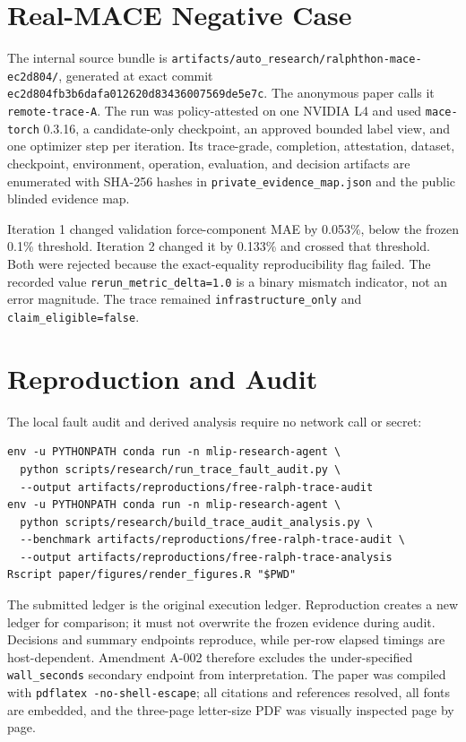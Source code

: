 \documentclass[10pt]{article}
\begin{document}
\section{Real-MACE Negative Case}

The internal source bundle is
\texttt{artifacts/auto\_research/ralphthon-mace-ec2d804/}, generated at exact commit
\texttt{ec2d804fb3b6dafa012620d83436007569de5e7c}. The anonymous paper calls it \texttt{remote-trace-A}. The run was policy-attested on one NVIDIA L4 and used \texttt{mace-torch} 0.3.16, a candidate-only checkpoint, an approved bounded label view, and one optimizer step per iteration. Its trace-grade, completion, attestation, dataset, checkpoint, environment, operation, evaluation, and decision artifacts are enumerated with SHA-256 hashes in \texttt{private\_evidence\_map.json} and the public blinded evidence map.

Iteration 1 changed validation force-component MAE by 0.053\%, below the frozen 0.1\% threshold. Iteration 2 changed it by 0.133\% and crossed that threshold. Both were rejected because the exact-equality reproducibility flag failed. The recorded value \texttt{rerun\_metric\_delta=1.0} is a binary mismatch indicator, not an error magnitude. The trace remained \texttt{infrastructure\_only} and \texttt{claim\_eligible=false}.

\section{Reproduction and Audit}

The local fault audit and derived analysis require no network call or secret:

\begin{verbatim}
env -u PYTHONPATH conda run -n mlip-research-agent \
  python scripts/research/run_trace_fault_audit.py \
  --output artifacts/reproductions/free-ralph-trace-audit
env -u PYTHONPATH conda run -n mlip-research-agent \
  python scripts/research/build_trace_audit_analysis.py \
  --benchmark artifacts/reproductions/free-ralph-trace-audit \
  --output artifacts/reproductions/free-ralph-trace-analysis
Rscript paper/figures/render_figures.R "$PWD"
\end{verbatim}

The submitted ledger is the original execution ledger. Reproduction creates a new ledger for comparison; it must not overwrite the frozen evidence during audit. Decisions and summary endpoints reproduce, while per-row elapsed timings are host-dependent. Amendment A-002 therefore excludes the under-specified \texttt{wall\_seconds} secondary endpoint from interpretation. The paper was compiled with \texttt{pdflatex -no-shell-escape}; all citations and references resolved, all fonts are embedded, and the three-page letter-size PDF was visually inspected page by page.
\end{document}
